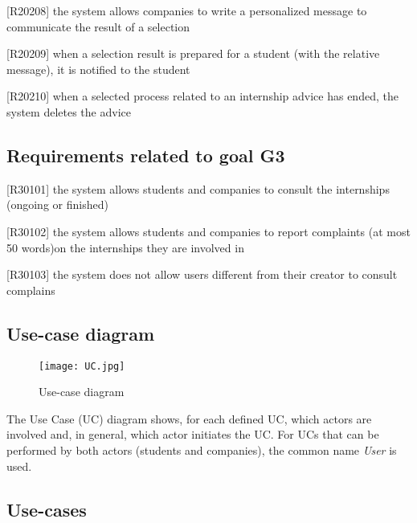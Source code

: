 		[R20208] the system allows companies to write a personalized message to communicate the result of a selection
		
		[R20209] when a selection result is prepared for a student (with the relative message), it is notified to the student
		
		[R20210] when a selected process related to an internship advice has ended, the system deletes the advice
		
		\subsection{Requirements related to goal G3}
		
		[R30101] the system allows students and companies to consult the internships (ongoing or finished)
		
		[R30102] the system allows students and companies to report complaints (at most 50 words)on the internships they are involved in
		
		[R30103] the system does not allow users different from their creator to consult complains
		
		\subsection{Use-case diagram}
			
			\begin{figure}[H]
				\centering
				\texttt{[image: UC.jpg]}
				\caption{Use-case diagram}
			\end{figure}
			
			The Use Case (UC) diagram shows, for each defined UC, which actors are involved and, in general, which actor initiates the UC. For UCs that can be performed by both actors (students and companies), the common name \textit{User} is used.	
			
		\subsection{Use-cases}
			

